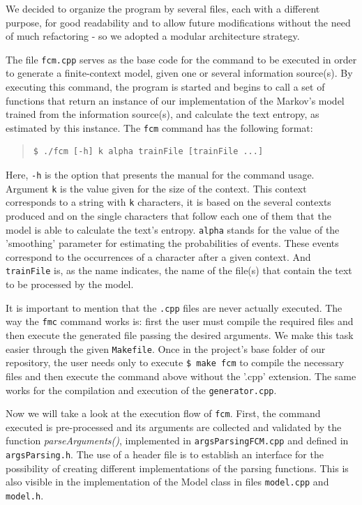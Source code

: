 \documentclass[12pt]{article}
\begin{document}
We decided to organize the program by several files, each with a different
purpose, for good readability and to allow future modifications without the 
need of much refactoring - so we adopted a modular architecture strategy.

The file \texttt{fcm.cpp} serves as the base code for the command to be executed in order to 
generate a finite-context model, given one or several information source(s).
By executing this command, the program is started and begins to
call a set of functions that return an instance of our 
implementation of the Markov's model trained from the information source(s), 
and calculate the text entropy, as estimated by this instance.
The \texttt{fcm} command has the following format:

\begin{quote}
\begin{verbatim}
$ ./fcm [-h] k alpha trainFile [trainFile ...]
\end{verbatim}
\end{quote}

Here, \texttt{-h} is the option that presents the manual for the command usage.
Argument \texttt{k} is the value given for the size of the context.
This context corresponds to a string with \texttt{k} characters, it is based on
the several contexts produced and on the single characters that follow each one
of them that the model is able to calculate the text's entropy.
\texttt{alpha} stands for the value of the 'smoothing' parameter for estimating
the probabilities of events. 
These events correspond to the occurrences of a character after a given context.
And \texttt{trainFile} is, as the name indicates, the name of the file(s) that
contain the text to be processed by the model.

It is important to mention that the \texttt{.cpp} files are never actually
executed. The way the \texttt{fmc} command works is: first the user must 
compile the required files and then execute the generated file passing the 
desired arguments.
We make this task easier through the given \texttt{Makefile}.
Once in the project's base folder of our repository, the user needs only to
execute \texttt{\$ make fcm} to compile the necessary files and then 
execute the command above without the '.cpp' extension.
The same works for the compilation and execution of the \texttt{generator.cpp}.

Now we will take a look at the execution flow of \texttt{fcm}.
First, the command executed is pre-processed and its arguments are collected
and validated by the function {\it parseArguments()\/}, implemented in 
\texttt{argsParsingFCM.cpp} and defined in \texttt{argsParsing.h}.
The use of a header file is to establish an interface for the possibility of
creating different implementations of the parsing functions.
This is also visible in the implementation of the Model class in files 
\texttt{model.cpp} and \texttt{model.h}.
\end{document}
